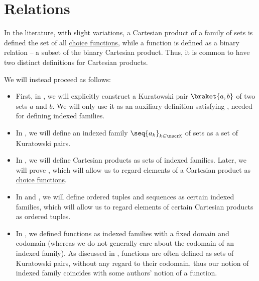 \section{Relations}\label{sec:relations}

\begin{remark}\label{rem:cartesian_products_and_functions}
  In the literature, with slight variations, a Cartesian product of a family of sets is defined the set of all \hyperref[def:choice_function]{choice functions}, while a function is defined as a binary relation -- a subset of the binary Cartesian product. Thus, it is common to have two distinct definitions for Cartesian products.

  We will instead proceed as follows:
  \begin{itemize}
    \item First, in , we will explicitly construct a Kuratowski pair \( \braket{ a, b } \) of two sets \( a \) and \( b \). We will only use it as an auxiliary definition satisfying , needed for defining indexed families.

    \item In , we will define an indexed family \( \seq{ a_k }_{k \in \mscrK} \) of sets as a set of Kuratowski pairs.

    \item In , we will define Cartesian products as sets of indexed families. Later, we will prove , which will allow us to regard elements of a Cartesian product as \hyperref[def:choice_function]{choice functions}.

    \item In  and , we will define ordered tuples and sequences as certain indexed families, which will allow us to regard elements of certain Cartesian products as ordered tuples.

    \item In , we defined functions as indexed families with a fixed domain and codomain (whereas we do not generally care about the codomain of an indexed family). As discussed in , functions are often defined as sets of Kuratowski pairs, without any regard to their codomain, thus our notion of indexed family coincides with some authors' notion of a function.
  \end{itemize}


\end{remark}

